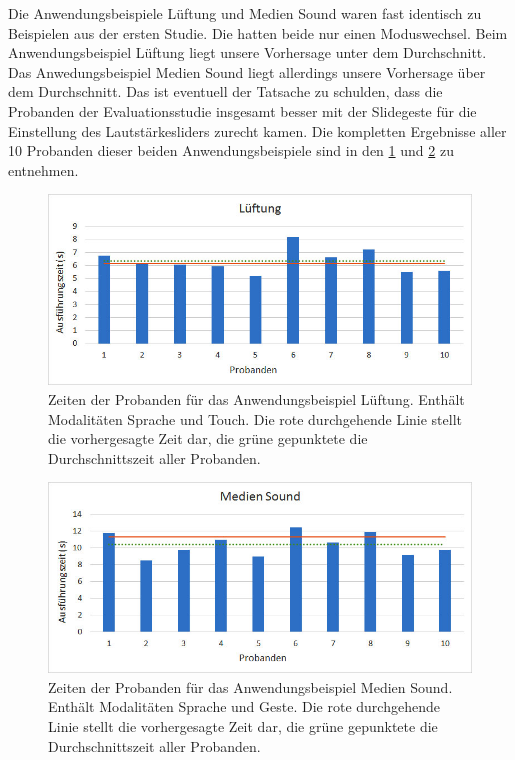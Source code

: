 Die Anwendungsbeispiele Lüftung und Medien Sound waren fast identisch zu Beispielen aus der ersten Studie. Die hatten beide nur einen Moduswechsel. Beim Anwendungsbeispiel Lüftung liegt unsere Vorhersage unter dem Durchschnitt. Das Anwedungsbeispiel Medien Sound liegt allerdings unsere Vorhersage über dem Durchschnitt. 
Das ist eventuell der Tatsache zu schulden, dass die Probanden der Evaluationsstudie insgesamt besser mit der Slidegeste für die Einstellung des Lautstärkesliders zurecht kamen. 
Die kompletten Ergebnisse aller 10 Probanden dieser beiden Anwendungsbeispiele sind in den \ref{fig:Luft_Times} und \ref{fig:MedienS_Times} zu entnehmen. 
\begin{figure}
			\centering
			\includegraphics[width=1\textwidth]{img/Luft_Times.jpg}
			\caption[Zeiten der Probanden für das Anwendungsbeispiel Lüftung.]{Zeiten der Probanden für das Anwendungsbeispiel Lüftung. Enthält Modalitäten Sprache und Touch. Die rote durchgehende Linie stellt die vorhergesagte Zeit dar, die grüne gepunktete die Durchschnittszeit aller Probanden.}
			\label{fig:Luft_Times}
\end{figure}
\begin{figure}
			\centering
			\includegraphics[width=1\textwidth]{img/Medien_S_Times.jpg}
			\caption[Zeiten der Probanden für das Anwendungsbeispiel Medien Sound.]{Zeiten der Probanden für das Anwendungsbeispiel Medien Sound. Enthält Modalitäten Sprache und Geste. Die rote durchgehende Linie stellt die vorhergesagte Zeit dar, die grüne gepunktete die Durchschnittszeit aller Probanden.}
			\label{fig:MedienS_Times}		
\end{figure}

